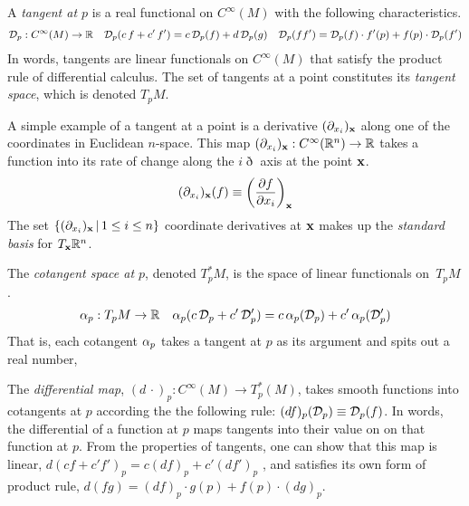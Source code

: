 \documentclass[11pt]{article}
\numberwithin{equation}{section}
\begin{document}
\begin{samepage}
\begin{dfn}
A \textit{tangent at $p$} is a real functional on $C^\infty(M)$ with the following characteristics.
\begin{align}
\label{eq:tangent-properties}
  \mathcal{D}_p
:
  C^\infty(M)
\rightarrow
  \mathbb{R}
&&
  \mathcal{D}_p(c\,f + c'\,f')
=
  c\,\mathcal{D}_p(f)
+
  d\,\mathcal{D}_p(g)
&&
  \mathcal{D}_p(ff')
=
  \mathcal{D}_p(f)\cdot f'(p)
+
  f(p) \cdot \mathcal{D}_p(f')
\end{align}
In words, tangents are linear functionals on $C^\infty(M)$ that satisfy the product rule of differential calculus.
The set of tangents at a point constitutes its \textit{tangent space}, which is denoted $T_pM$.
\end{dfn}
\end{samepage}

\begin{ex}
A simple example of a tangent at a point is a derivative $(\partial_{x_i})_{\mathbf{x}}$ along one of the coordinates in Euclidean $n$-space.
This map $(\partial_{x_i})_{\mathbf{x}}:C^\infty(\mathbb{R}^n)\rightarrow\mathbb{R}$ takes a function into its rate of change along the $i\eth$ axis at the point $\mathbf{x}$.
\begin{align}
\label{eq:coordinate-directional-derivative}
  (\partial_{x_i})_{\mathbf{x}}(f)
\equiv
  \left(\frac {\partial f}{\partial x_i}\right)_{\mathbf{x}}
\end{align}
The set $\{(\partial_{x_i})_{\mathbf{x}}\,|\,1\leq i\leq n\}$ coordinate derivatives at $\mathbf{x}$ makes up the \textit{standard basis} for $T_{\mathbf{x}}\mathbb{R}^n$.
\end{ex}

\begin{dfn}
The \textit{cotangent space at $p$}, denoted $T_p^*M$, is the space of linear functionals on~$T_pM$.
\begin{align}
  \alpha _p
:
  T_pM
\rightarrow
  \mathbb{R}
&&
  \alpha _p
  (c\,\mathcal{D}_p + c'\,\mathcal{D}_p')
=
  c\,
  \alpha _p(\mathcal{D}_p)
+
  c'\,
  \alpha _p(\mathcal{D}_p')
\end{align}
That is, each cotangent $\alpha _p$ takes a tangent at $p$ as its argument and spits out a real number, 
\end{dfn}

\begin{dfn}
\label{eq:differential-map-on-0-forms}
The \textit{differential map}, $(d\,\cdot)_p:C^\infty(M)\rightarrow T_p^*(M)$, takes smooth functions into cotangents at $p$ according the the following rule:
$(df)_p(\mathcal{D}_p)\equiv\mathcal{D}_p(f)$.
In words, the differential of a function at $p$ maps tangents into their value on on that function at $p$.
From the properties of tangents, one can show that this map is linear,
$
  d(cf + c'f')_p
=
  c(df)_p
+
  c'(df')_p
$
, and satisfies its own form of product rule,
$
  d(fg)
=
  (df)_p\cdot g(p)
+
  f(p)\cdot (dg)_p
$.\footnotemark
{}
\end{dfn}
\end{document}
